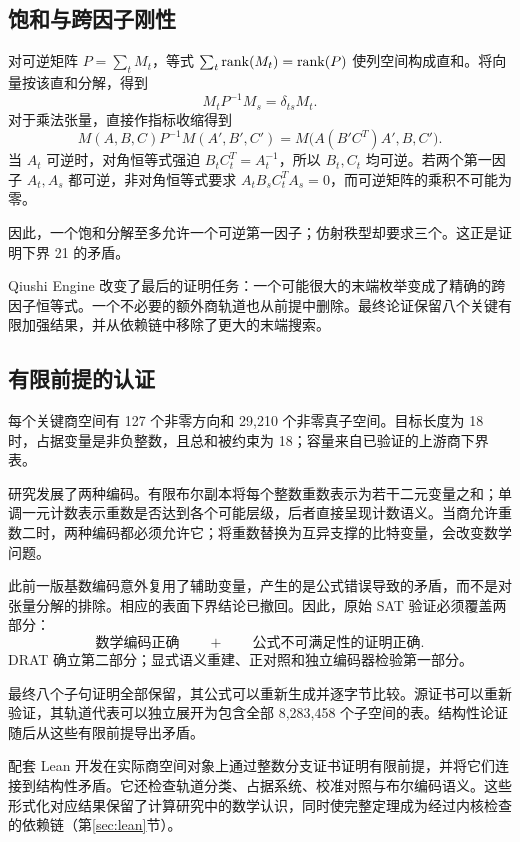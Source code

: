 \subsection{饱和与跨因子刚性}\label{route:saturation}

对可逆矩阵 $P=\sum_tM_t$，等式 $\sum_t\operatorname{rank}(M_t)=\operatorname{rank}(P)$ 使列空间构成直和。将向量按该直和分解，得到
\[
 M_tP^{-1}M_s=\delta_{ts}M_t.
\]
对于乘法张量，直接作指标收缩得到
\[
 M(A,B,C)P^{-1}M(A',B',C')
 =M\bigl(A(B'C^T)A',B,C'\bigr).
\]
当 $A_t$ 可逆时，对角恒等式强迫 $B_tC_t^T=A_t^{-1}$，所以 $B_t,C_t$ 均可逆。若两个第一因子 $A_t,A_s$ 都可逆，非对角恒等式要求 $A_tB_sC_t^TA_s=0$，而可逆矩阵的乘积不可能为零。

因此，一个饱和分解至多允许一个可逆第一因子；仿射秩型却要求三个。这正是证明下界 21 的矛盾。

Qiushi Engine 改变了最后的证明任务：一个可能很大的末端枚举变成了精确的跨因子恒等式。一个不必要的额外商轨道也从前提中删除。最终论证保留八个关键有限加强结果，并从依赖链中移除了更大的末端搜索。

\subsection{有限前提的认证}\label{route:certificates}

每个关键商空间有 127 个非零方向和 29,210 个非零真子空间。目标长度为 18 时，占据变量是非负整数，且总和被约束为 18；容量来自已验证的上游商下界表。

研究发展了两种编码。有限布尔副本将每个整数重数表示为若干二元变量之和；单调一元计数表示重数是否达到各个可能层级，后者直接呈现计数语义。当商允许重数二时，两种编码都必须允许它；将重数替换为互异支撑的比特变量，会改变数学问题。

此前一版基数编码意外复用了辅助变量，产生的是公式错误导致的矛盾，而不是对张量分解的排除。相应的表面下界结论已撤回。因此，原始 SAT 验证必须覆盖两部分：
\[
 \text{数学编码正确}
 \qquad+\qquad
 \text{公式不可满足性的证明正确}.
\]
DRAT 确立第二部分；显式语义重建、正对照和独立编码器检验第一部分。

最终八个子句证明全部保留，其公式可以重新生成并逐字节比较。源证书可以重新验证，其轨道代表可以独立展开为包含全部 8,283,458 个子空间的表。结构性论证随后从这些有限前提导出矛盾。

配套 Lean 开发在实际商空间对象上通过整数分支证书证明有限前提，并将它们连接到结构性矛盾。它还检查轨道分类、占据系统、校准对照与布尔编码语义。这些形式化对应结果保留了计算研究中的数学认识，同时使完整定理成为经过内核检查的依赖链（第\ref{sec:lean}节）。

